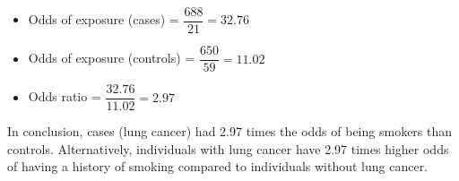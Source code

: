 \documentclass{article}
\begin{document}
\begin{itemize}
    \item Odds of exposure (cases) = $\dfrac{688}{21} = 32.76$
    \item Odds of exposure (controls) = $\dfrac{650}{59} = 11.02$
    \item Odds ratio = $\dfrac{32.76}{11.02} = 2.97$
\end{itemize}
In conclusion, cases (lung cancer) had 2.97 times the odds of being smokers than controls.
Alternatively, individuals with lung cancer have 2.97 times higher odds of having a history of smoking compared to individuals without lung cancer.
\end{document}
